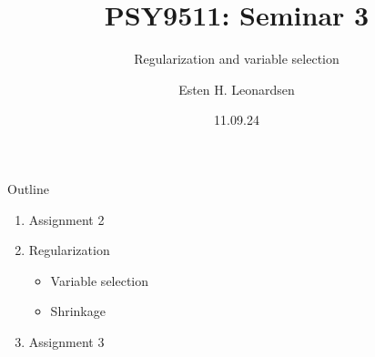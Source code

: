 \documentclass{beamer}
\title{PSY9511: Seminar 3}
\subtitle{Regularization and variable selection}
\author{Esten H. Leonardsen}
\date{11.09.24}
\begin{document}
	\begin{frame}
	 	\maketitle
	\end{frame}

    \begin{frame}{Outline}
        \centering
        \vfill
        \begin{enumerate}
            \item Assignment 2
            \item Regularization
            \begin{itemize}
                \item Variable selection
                \item Shrinkage
            \end{itemize}
            \item Assignment 3
        \end{enumerate}
        \vfill
    \end{frame}

    
    
\end{document}

